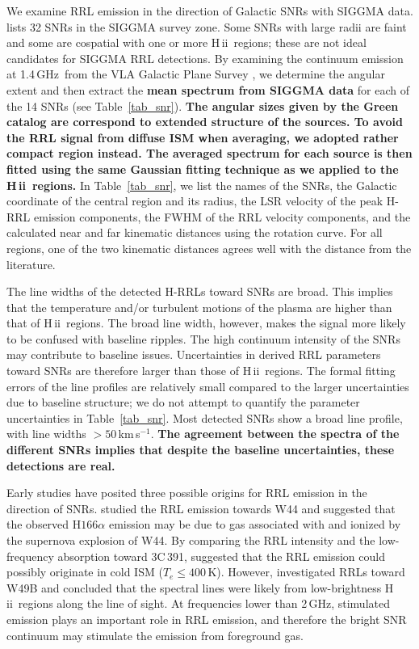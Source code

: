 \documentclass[manuscript]{aastex61}
\newcommand{\hii}{{\rm H\,}{{\sc ii}}}
\newcommand{\kms}{\,km\,s$^{-1}$}
\newcommand{\ghz}{\,GHz}
\begin{document}
We examine RRL emission in the direction of Galactic SNRs with SIGGMA data.
\citet[][hereafter the ``Green catalog'']{Green2014} lists 32 SNRs in the SIGGMA survey zone.
Some SNRs with large radii are faint and some are cospatial with one or more \hii\ regions; these are not ideal candidates for SIGGMA RRL detections.
By examining the continuum emission at 1.4\ghz\ from the VLA Galactic Plane Survey \citep[VGPS,][]{Stil2006}, we determine the angular extent and then extract the \textbf{mean spectrum from SIGGMA data} for each of the 14 SNRs (see Table~\ref{tab_snr}).
\textbf{The angular sizes given by the Green catalog are correspond to extended structure of the sources. 
To avoid the RRL signal from diffuse ISM when averaging, we adopted rather compact region instead.
The averaged spectrum for each source is then fitted using the same Gaussian fitting technique as we applied to the \hii\ regions.}
In Table~\ref{tab_snr}, we list the names of the SNRs, the Galactic coordinate of the central region and its radius, the LSR velocity of the peak H-RRL emission components, the FWHM of the RRL velocity components, and the calculated near and far kinematic distances using the \citet{Reid2014} rotation curve.
For all regions, one of the two kinematic distances agrees well with the distance from the literature.

The line widths of the detected H-RRLs toward SNRs are broad. 
This implies that the temperature and/or turbulent motions of the plasma are higher than that of \hii\ regions.
The broad line width, however, makes the signal  more likely to be confused with baseline ripples.
The high continuum intensity of the SNRs may contribute to baseline issues. 
Uncertainties in derived RRL parameters toward SNRs are therefore larger than those of \hii\ regions.
The formal fitting errors of the line profiles are relatively small compared to the larger uncertainties due to baseline structure; we do not attempt to quantify the parameter uncertainties in Table~\ref{tab_snr}.
Most detected SNRs show a broad line profile, with line widths $>50$\kms.
\textbf{The agreement between the spectra of the different SNRs implies that despite the baseline uncertainties, these detections are real.}

Early studies have posited three possible origins for RRL emission in the direction of SNRs.
\citet{Bignell1973} studied the RRL emission towards W44 and suggested that the observed H$166\alpha$ emission may be due to gas associated with and ionized by the supernova explosion of W44.
By comparing the RRL intensity and the low-frequency absorption toward 3C\,391, \citet{Cesarsky1973b} suggested that the RRL emission could possibly originate in cold ISM ($T_e \leq 400$\,K).
However, \citet{Pankonin1976} investigated RRLs toward W49B and concluded that the spectral lines were likely from low-brightness \hii\ regions along the line of sight.
At frequencies lower than 2\ghz, stimulated emission plays an important role in RRL emission, and therefore the bright SNR continuum may stimulate the emission from foreground gas.
\end{document}
